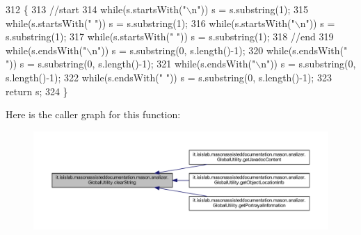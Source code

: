 \begin{DoxyCode}
312                                               \{
313         \textcolor{comment}{//start}
314         \textcolor{keywordflow}{while}(s.startsWith(\textcolor{stringliteral}{"\(\backslash\)n"}))   s = s.substring(1);
315         \textcolor{keywordflow}{while}(s.startsWith(\textcolor{stringliteral}{" "}))    s = s.substring(1);
316         \textcolor{keywordflow}{while}(s.startsWith(\textcolor{stringliteral}{"\(\backslash\)n"}))   s = s.substring(1);
317         \textcolor{keywordflow}{while}(s.startsWith(\textcolor{stringliteral}{" "}))    s = s.substring(1);
318         \textcolor{comment}{//end}
319         \textcolor{keywordflow}{while}(s.endsWith(\textcolor{stringliteral}{"\(\backslash\)n"})) s = s.substring(0, s.length()-1);
320         \textcolor{keywordflow}{while}(s.endsWith(\textcolor{stringliteral}{" "}))  s = s.substring(0, s.length()-1);
321         \textcolor{keywordflow}{while}(s.endsWith(\textcolor{stringliteral}{"\(\backslash\)n"})) s = s.substring(0, s.length()-1);
322         \textcolor{keywordflow}{while}(s.endsWith(\textcolor{stringliteral}{" "}))  s = s.substring(0, s.length()-1);
323         \textcolor{keywordflow}{return} s;
324     \}
\end{DoxyCode}


Here is the caller graph for this function\-:
\nopagebreak
\begin{figure}[H]
\begin{center}
\leavevmode
\includegraphics[width=350pt]{classit_1_1isislab_1_1masonassisteddocumentation_1_1mason_1_1analizer_1_1_global_utility_a56635a5ae634c04b2a8ae186bb1cada8_icgraph}
\end{center}
\end{figure}


